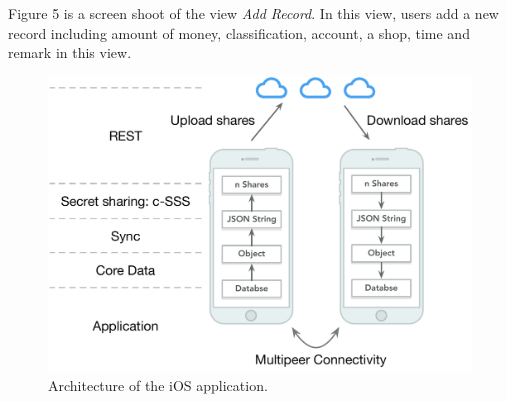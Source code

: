 \documentclass[twocolumn,10pt]{article}
\begin{document}
Figure 5 is a screen shoot of the view \emph{Add Record}. In this view, users add a new record including amount of money, classification, account, a shop, time and remark in this view.

\begin{figure}[t]
	\centering
	\includegraphics[scale=0.35]{architecture}
	\caption{Architecture of the iOS application.}
\end{figure}
\end{document}
